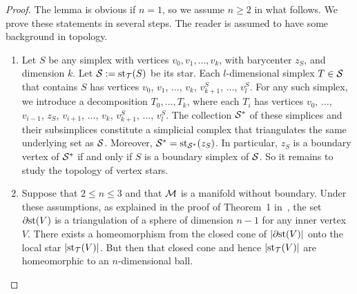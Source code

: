 \documentclass[10pt,a4paper]{article}
\begin{document}
\begin{proof}
    The lemma is obvious if $n = 1$, so we assume $n \geq 2$ in what follows. 
    We prove these statements in several steps. 
    The reader is assumed to have some background in topology. 
    \begin{enumerate}
    \item 
    Let $S$ be any simplex with vertices $v_0, v_1, \dots, v_k$, with barycenter $z_{S}$, and dimension $k$.
    Let ${\mathcal S} := \operatorname{st}_{{\mathcal T}}(S)$ be its star. 
    Each $l$-dimensional simplex $T \in {\mathcal S}$ that contains $S$ 
    has vertices $v_0$, $v_1$, $\dots$, $v_k$, $v_{k+1}^{S}$, $\dots$, $v_{l}^{S}$. 
    For any such simplex, we introduce a decomposition $T_{0}, \dots, T_{k}$, where each $T_{i}$ has vertices 
    $v_0$, $\dots$, $v_{i-1}$, $z_{S}$, $v_{i+1}$, $\dots$, $v_k$, $v_{k+1}^{S}$, $\dots$, $v_{l}^{S}$.
    The collection ${\mathcal S}^\ast$ of these simplices and their subsimplices constitute a simplicial complex 
    that triangulates the same underlying set as ${\mathcal S}$.
    Moreover, ${\mathcal S}^\ast = \operatorname{st}_{{\mathcal S}^\ast}(z_{S})$. 
    In particular, $z_{S}$ is a boundary vertex of ${\mathcal S}^\ast$ if and only if $S$ is a boundary simplex of ${\mathcal S}$. 
    So it remains to study the topology of vertex stars. 
    
    \item 
    Suppose that $2 \leq n \leq 3$ and that ${\mathcal M}$ is a manifold without boundary. 
    Under these assumptions, 
    as explained in the proof of Theorem~1 in~\cite{Siebenmann1979},
    the set ${\partial \rm st}(V)$ is a triangulation of a sphere of dimension $n-1$ for any inner vertex $V$. 
    There exists a homeomorphism from the closed cone of $\left| {\partial \rm st}(V) \right|$ onto the local star $\left| \operatorname{st}_{{\mathcal T}}(V) \right|$.
    But then that closed cone and hence $\left| \operatorname{st}_{{\mathcal T}}(V) \right|$ are homeomorphic to an $n$-dimensional ball. 
    

\end{enumerate}
\end{proof}
\end{document}
